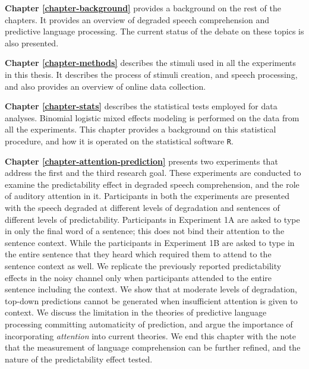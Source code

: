 \documentclass[a4paper, nobind]{templates/ociamthesis}
\begin{document}
\noindent
\textbf{Chapter \ref{chapter-background}} provides a background on the rest of the chapters.
It provides an overview of degraded speech comprehension and predictive language processing.
The current status of the debate on these topics is also presented.

\noindent
\textbf{Chapter \ref{chapter-methods}} describes the stimuli used in all the experiments in this thesis.
It describes the process of stimuli creation, and speech processing, and also provides an overview of online data collection.

\noindent
\textbf{Chapter \ref{chapter-stats}} describes the statistical tests employed for data analyses.
Binomial logistic mixed effects modeling is performed on the data from all the experiments.
This chapter provides a background on this statistical procedure,
and how it is operated on the statistical software \texttt{R}.

\noindent
\textbf{Chapter \ref{chapter-attention-prediction}} presents two experiments that address the first and the third research goal.
These experiments are conducted to examine the predictability effect in degraded speech comprehension,
and the role of auditory attention in it.
Participants in both the experiments are presented with the speech degraded at different levels of degradation
and sentences of different levels of predictability.
Participants in Experiment 1A are asked to type in only the final word of a sentence;
this does not bind their attention to the sentence context.
While the participants in Experiment 1B are asked to type in the entire sentence that they heard which required them to attend to the sentence context as well.
We replicate the previously reported predictability effects in the noisy channel only when participants attended to the entire sentence including the context.
We show that at moderate levels of degradation, top-down predictions cannot be generated when insufficient attention is given to context.
We discuss the limitation in the theories of predictive language processing committing automaticity of prediction,
and argue the importance of incorporating \emph{attention} into current theories.
We end this chapter with the note that the measurement of language comprehension can be further refined,
and the nature of the predictability effect tested.
\end{document}
